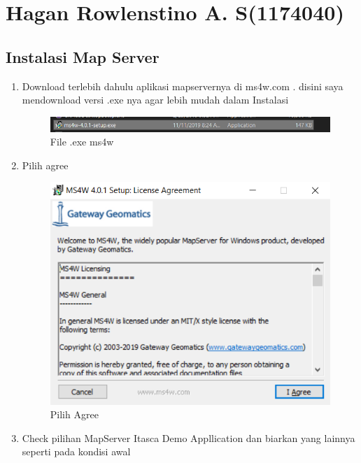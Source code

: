 \section{Hagan Rowlenstino A. S(1174040)}
\subsection{Instalasi Map Server}
\begin{enumerate}
    \item Download terlebih dahulu aplikasi mapservernya di ms4w.com . disini saya mendownload versi .exe nya agar lebih mudah dalam Instalasi
    \hfill\break
    \begin{figure}[H]
		\includegraphics[width=12cm]{figures/1174040/Python3/exe.PNG}
		\centering
		\caption{File .exe ms4w}
	\end{figure}
    \item Pilih agree
    \hfill\break
    \begin{figure}[H]
		\includegraphics[width=12cm]{figures/1174040/Python3/1.PNG}
		\centering
		\caption{Pilih Agree}
	\end{figure}
    \item Check pilihan MapServer Itasca Demo Appllication dan biarkan yang lainnya seperti pada kondisi awal
    \hfill\break
    \begin{figure}[H]

\end{figure}
\end{enumerate}
